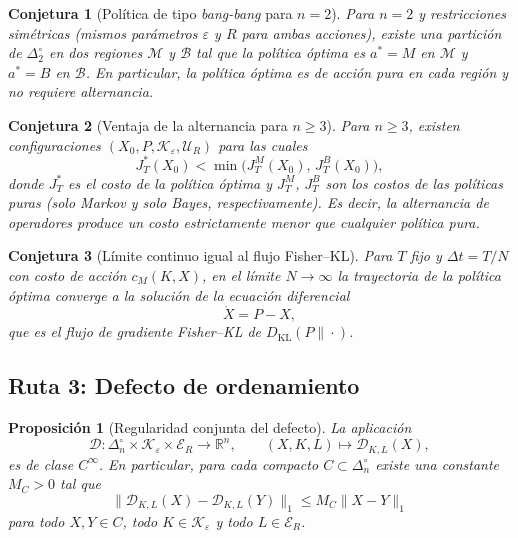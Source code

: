 \documentclass[12pt]{article}
\newtheorem{proposicion}{Proposición}[section]
\newtheorem{conjetura}{Conjetura}[section]
\begin{document}
\begin{conjetura}[Política de tipo \emph{bang-bang} para $n=2$]\label{conj:bangbang}
Para $n=2$ y restricciones simétricas (mismos parámetros $\varepsilon$ y $R$
para ambas acciones), existe una partición de $\Delta_2^\circ$ en dos regiones
$\mathcal M$ y $\mathcal B$ tal que la política óptima es $a^*=M$ en
$\mathcal M$ y $a^*=B$ en $\mathcal B$. En particular, la política óptima es de
acción pura en cada región y no requiere alternancia.
\end{conjetura}

\begin{conjetura}[Ventaja de la alternancia para $n\ge 3$]\label{conj:alternancia}
Para $n\ge 3$, existen configuraciones $(X_0,P,\mathcal K_\varepsilon,
\mathcal U_R)$ para las cuales
\[
J_T^*(X_0)<\min\!\bigl(J_T^M(X_0),\,J_T^B(X_0)\bigr),
\]
donde $J_T^*$ es el costo de la política óptima y $J_T^M$, $J_T^B$ son los
costos de las políticas puras (solo Markov y solo Bayes, respectivamente). Es
decir, la alternancia de operadores produce un costo estrictamente menor que
cualquier política pura.
\end{conjetura}

\begin{conjetura}[Límite continuo igual al flujo Fisher--KL]\label{conj:limite-continuo}
Para $T$ fijo y $\Delta t=T/N$ con costo de acción $c_M(K,X)$, en el límite
$N\to\infty$ la trayectoria de la política óptima converge a la solución de la
ecuación diferencial
\[
\dot X=P-X,
\]
que es el flujo de gradiente Fisher--KL de $D_{\mathrm{KL}}(P\|\cdot)$.
\end{conjetura}

\subsection*{Ruta 3: Defecto de ordenamiento}

\begin{proposicion}[Regularidad conjunta del defecto]\label{prop:defecto-suave}
La aplicación
\[
\mathcal D:\Delta_n^\circ\times\mathcal K_\varepsilon\times\mathcal E_R
\longrightarrow \mathbb R^n,
\qquad
(X,K,L)\longmapsto \mathcal D_{K,L}(X),
\]
es de clase $C^\infty$. En particular, para cada compacto $C\subset\Delta_n^\circ$
existe una constante $M_C>0$ tal que
\[
\|\mathcal D_{K,L}(X)-\mathcal D_{K,L}(Y)\|_1\le M_C\|X-Y\|_1
\]
para todo $X,Y\in C$, todo $K\in\mathcal K_\varepsilon$ y todo $L\in\mathcal E_R$.
\end{proposicion}
\end{document}

